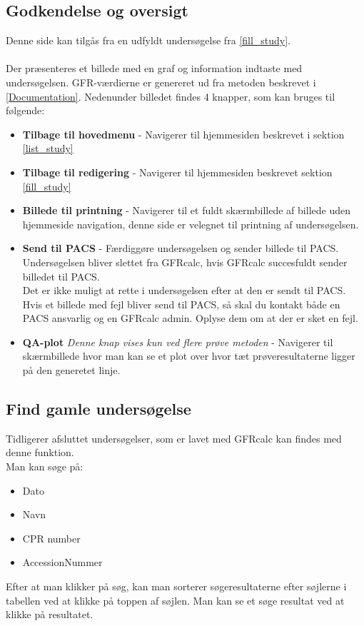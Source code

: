 \documentclass{article}
\begin{document}
\subsection{Godkendelse og oversigt}\label{present_study}
Denne side kan tilgås fra en udfyldt undersøgelse fra \ref{fill_study}.\\\\
Der præsenteres et billede med en graf og information indtaste med undersøgelsen. GFR-værdierne er genereret ud fra metoden beskrevet i \ref{Documentation}.  Nedenunder billedet findes 4 knapper, som kan bruges til følgende:
\begin{itemize}
	\item \textbf{Tilbage til hovedmenu} - Navigerer til hjemmesiden beskrevet i sektion \ref{list_study}
	\item \textbf{Tilbage til redigering} - Navigerer til hjemmesiden beskrevet sektion \ref{fill_study}
	\item \textbf{Billede til printning} - Navigerer til et fuldt skærmbillede af billede uden hjemmeside navigation, denne side er velegnet til printning af undersøgelsen.
	\item \textbf{Send til PACS} - Færdiggøre undersøgelsen og sender billede til PACS. Undersøgelsen bliver slettet fra GFRcalc, hvis GFRcalc succesfuldt sender billedet til PACS.\\ Det er ikke muligt at rette i undersøgelsen efter at den er sendt til PACS.\\
	Hvis et billede med fejl bliver send til PACS, så skal du kontakt både en PACS ansvarlig og en GFRcalc admin. Oplyse dem om at der er sket en fejl.   
	\item \textbf{QA-plot} \textit{Denne knap vises kun ved flere prøve metoden} - Navigerer til skærmbillede hvor man kan se et plot over hvor tæt prøveresultaterne ligger på den generetet linje.
\end{itemize}

\subsection{Find gamle undersøgelse}\label{search}
Tidligerer afsluttet undersøgelser, som er lavet med GFRcalc kan findes med denne funktion.\\
Man kan søge på:
\begin{itemize}
	\item Dato
	\item Navn
	\item CPR number
	\item AccessionNummer 
\end{itemize}
Efter at man klikker på søg, kan man sorterer søgeresultaterne efter søjlerne i tabellen ved at klikke på toppen af søjlen. Man kan se et søge resultat ved at klikke på resultatet.\\
\end{document}
